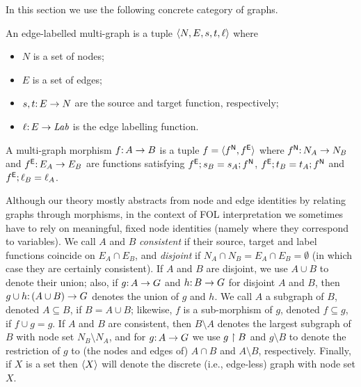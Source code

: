 \medskip\noindent
In this section we use the following concrete category of graphs.
%
\begin{definition}
An edge-labelled multi-graph is a tuple $\langle N,E,s,t,\ell\rangle$ where
\begin{itemize}
\item $N$ is a set of nodes;
\item $E$ is a set of edges;
\item $s,t{:}\, E\rightarrow N$ are the source and target function, respectively;
\item $\ell{:}\, E\rightarrow \mathit{Lab}$ is the edge labelling function.
\end{itemize}
A multi-graph morphism $f{:}\, A\rightarrow B$ is a tuple $f=\langle f^{\mathsf N},f^{\mathsf E}\rangle$ where $f^{\mathsf N}{:}\, N_A\rightarrow N_B$ and $f^{\mathsf E}{:}\, E_A\rightarrow E_B$ are functions satisfying $f^{\mathsf E};s_B=s_A;f^{\mathsf N}$, $f^{\mathsf E};t_B=t_A;f^{\mathsf N}$ and $f^{\mathsf E};\ell_B=\ell_A$.
\end{definition}
%
Although our theory mostly abstracts from node and edge identities by relating graphs through morphisms, in the context of FOL interpretation we sometimes have to rely on meaningful, fixed node identities (namely where they correspond to variables). We call $A$ and $B$ \emph{consistent} if their source, target and label functions coincide on $E_A\cap E_B$, and \emph{disjoint} if $N_A\cap N_B=E_A\cap E_B=\emptyset$ (in which case they are certainly consistent).  If $A$ and $B$ are disjoint, we use $A\cup B$ to denote their union; also, if $g{:}\, A\rightarrow G$ and $h{:}\, B\rightarrow G$ for disjoint $A$ and $B$, then $g\cup h{:}\, (A\cup B)\rightarrow G$ denotes the union of $g$ and $h$. We call $A$ a subgraph of $B$, denoted $A\subseteq B$, if $B=A\cup B$; likewise, $f$ is a sub-morphism of $g$, denoted $f\subseteq g$, if $f\cup g=g$. If $A$ and $B$ are consistent, then $B\setminus A$ denotes the largest subgraph of $B$ with node set $N_B\setminus N_A$, and for $g{:}\, A\rightarrow G$ we use $g\restriction B$ and $g\setminus B$ to denote the restriction of $g$ to (the nodes and edges of) $A \cap B$ and $A\setminus B$, respectively. Finally, if $X$ is a set then $\langle X\rangle$ will denote the discrete (i.e., edge-less) graph with node set $X$.

